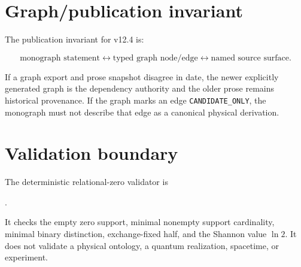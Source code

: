 \section{Graph/publication invariant}

The publication invariant for v12.4 is:

\[
\boxed{
\text{monograph statement}
\longleftrightarrow
\text{typed graph node/edge}
\longleftrightarrow
\text{named source surface}.
}
\]

If a graph export and prose snapshot disagree in date, the newer explicitly generated graph
is the dependency authority and the older prose remains historical provenance. If the graph
marks an edge \texttt{CANDIDATE\_ONLY}, the monograph must not describe that edge as a
canonical physical derivation.

\section{Validation boundary}

The deterministic relational-zero validator is

.

It checks the empty zero support, minimal nonempty support cardinality, minimal binary
distinction, exchange-fixed half, and the Shannon value $\ln2$. It does not validate a
physical ontology, a quantum realization, spacetime, or experiment.

\clearpage
